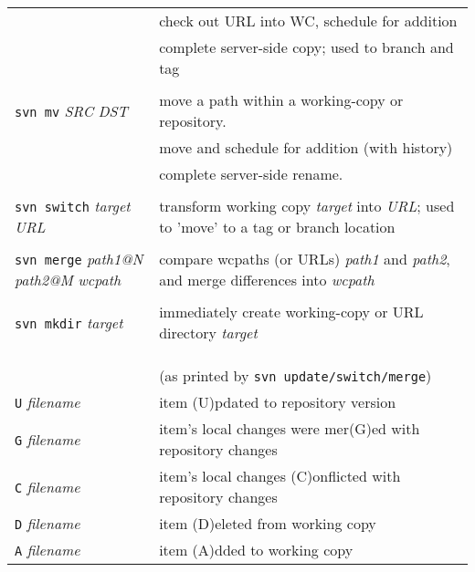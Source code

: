 \documentclass{report}
\begin{document}
\begin{tabular}{ll}
\hspace{0.5in}{\tt URL => WC}		&
check out URL into WC, schedule for addition  \\

\hspace{0.5in}{\tt URL => URL}		&
complete server-side copy;  used to branch and tag  \\

\\
{\tt svn mv} {\sl SRC} {\sl DST}		&
move a path within a working-copy or repository.  \\

\hspace{0.5in}{\tt WC => WC}		&
move and schedule for addition (with history)  \\

\hspace{0.5in}{\tt URL => URL}		&
complete server-side rename.  \\

\\
{\tt svn switch} {\sl target} {\sl URL}		&
transform working copy {\sl target} into {\sl URL}; used to 'move' to
a tag or branch location   \\

\\
{\tt svn merge} {\sl path1@N} {\sl path2@M} {\sl wcpath}	&
compare wcpaths (or URLs) {\sl path1} and {\sl path2}, and merge differences
into {\sl wcpath} \\

\\
{\tt svn mkdir} {\sl target}		&
immediately create working-copy or URL directory {\sl target}   \\
						 \\
\\
\\
\vspace{0.1in} \hspace{-0.1in}{\bf\Large File Status Flags} &
(as printed by {\tt svn update/switch/merge})		 \\

{\tt U} {\sl filename}				&
item (U)pdated to repository version	 	 \\

{\tt G} {\sl filename}				&
item's local changes were mer(G)ed with repository changes \\

{\tt C} {\sl filename}				&
item's local changes (C)onflicted with repository changes \\

{\tt D} {\sl filename}				&
item (D)eleted from working copy                \\

{\tt A} {\sl filename}				&
item (A)dded to working copy			 \\

\end{tabular}
\end{document}
